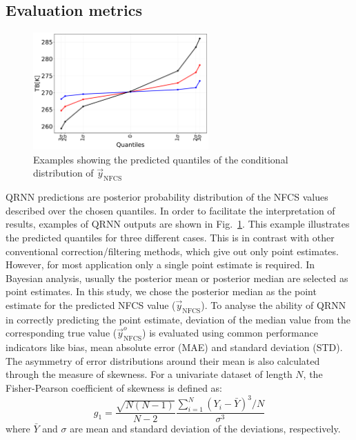 \documentclass[amt, manuscript]{copernicus}
\newcommand{\ynfcs}{\vec{y}_\text{NFCS}}
\newcommand{\yonfcs}{\vec{y}^{o}_\text{NFCS}}
\begin{document}
\subsection{Evaluation metrics}
\label{sec:validation}
\begin{figure}[t]
	\centering
	\includegraphics[height=45mm]{Figures/posterior_distribution_I1V.pdf} 
	\caption{Examples showing the predicted quantiles of the conditional distribution of $\ynfcs$ }
	\label{fig:posterior_distribution_I1V}	
\end{figure}
QRNN predictions are posterior probability distribution of the NFCS values
described over the chosen quantiles. In order to facilitate the interpretation
of results, examples of QRNN outputs are shown in
Fig.~\ref{fig:posterior_distribution_I1V}. This example illustrates the
predicted quantiles for three different cases. This is in contrast with other
conventional correction/filtering methods, which give out only point estimates.
However, for most application only a single point estimate is required. In
Bayesian analysis, usually the posterior mean or posterior median are selected
as point estimates. In this study, we chose the posterior median as the point
estimate for the predicted NFCS value ($\ynfcs$). To analyse the ability of QRNN
in correctly predicting the point estimate, deviation of the median value from
the corresponding true value ($\yonfcs$) is evaluated using common performance
indicators like bias, mean absolute error (MAE) and standard deviation (STD).
The asymmetry of error distributions around their mean is also calculated
through the measure of skewness. For a univariate dataset of length $N$, the
Fisher-Pearson coefficient of skewness is defined as:
\begin{equation}
g_1 = 	\frac{\sqrt{N(N-1)}}{N-2} \frac{\sum_{i = 1}^{N}(Y_i - \bar{Y})^3/N}{\sigma^3}
\end{equation}
where $\bar{Y}$ and $\sigma$ are mean and standard deviation of the deviations, respectively.
\end{document}
